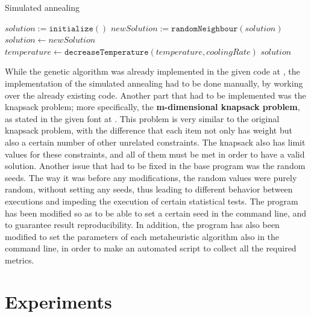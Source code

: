 \documentclass{article}[12pt]
\begin{document}
	\begin{algorithm}
	\caption{Simulated annealing}\label{annealing}
	\begin{algorithmic}[1]
			\State $solution := \texttt{initialize}()$
				\State $newSolution := \texttt{randomNeighbour}(solution)$
					\State $solution \gets newSolution$
				\EndIf
				 \State $temperature \gets \texttt{decreaseTemperature}(temperature, coolingRate)$
			\EndWhile
			\Return $solution$
		\EndProcedure
	\end{algorithmic}
	\end{algorithm}
	
	While the genetic algorithm was already implemented in the given code at \cite{codigoga}, the implementation of the simulated annealing had to be done manually, by working over the already existing code. Another part that had to be implemented was the knapsack problem; more specifically, the \textbf{m-dimensional knapsack problem}, as stated in the given font at \cite{knapsack}. This problem is very similar to the original knapsack problem, with the difference that each item not only has weight but also a certain number of other unrelated constraints. The knapsack also has limit values for these constraints, and all of them must be met in order to have a valid solution.
\bigbreak
	Another issue that had to be fixed in the base program was the random seeds. The way it was before any modifications, the random values were purely random, without setting any seeds, thus leading to different behavior between executions and impeding the execution of certain statistical tests. The program has been modified so as to be able to set a certain seed in the command line, and to guarantee result reproducibility. In addition, the program has also been modified to set the parameters of each metaheuristic algorithm also in the command line, in order to make an automated script to collect all the required metrics.
	
	\section{Experiments} \label{Experiments}
	
\end{document}
